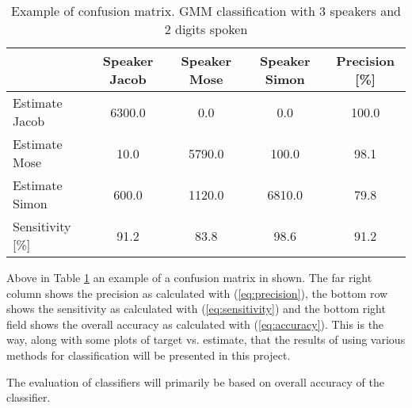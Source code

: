 \begin{table}[H]                                              
\centering                                                     
\begin{tabular}{|l|c|c|c|c|}                                   
\hline                                                         
  & Speaker Jacob & Speaker Mose & Speaker Simon & Precision [\%] \\
\hline                                                         
Estimate Jacob & 6300.0 & 0.0 & 0.0 & 100.0 \\                 
\hline                                                         
Estimate Mose & 10.0 & 5790.0 & 100.0 & 98.1 \\                
\hline                                                         
Estimate Simon & 600.0 & 1120.0 & 6810.0 & 79.8 \\             
\hline                                                         
Sensitivity [\%] & 91.2 & 83.8 & 98.6 & 91.2 \\                
\hline                                                         
\end{tabular}                                                  
\caption{Example of confusion matrix. GMM classification with 3 speakers and 2 digits spoken}                          
\label{table:Ex_conf}                                       
\end{table}

Above in Table \ref{table:Ex_conf} an example of a confusion matrix in shown.
The far right column shows the precision as calculated with (\ref{eq:precision}), 
the bottom row shows the sensitivity as calculated with (\ref{eq:sensitivity})
and the bottom right field shows the overall accuracy as calculated with (\ref{eq:accuracy}).
This is the way, along with some plots of target vs. estimate, that the results of using various methods for classification will be presented in this project.

The evaluation of classifiers will primarily be based on overall accuracy of the classifier. 


